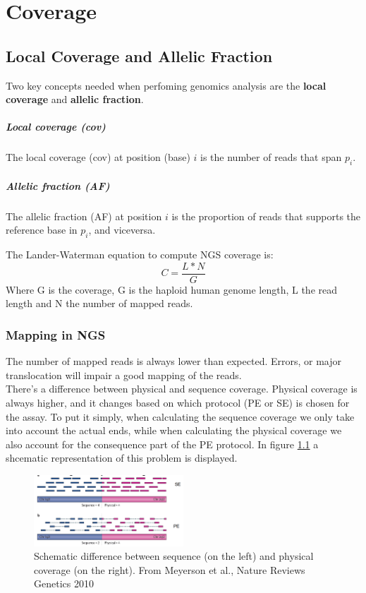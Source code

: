 \graphicspath{{chapters/02/}}
\chapter{Coverage}
\section{Local Coverage and Allelic Fraction}
Two key concepts needed when perfoming genomics analysis are the \textbf{local coverage} and \textbf{allelic fraction}.

	\paragraph*{Local coverage (cov)}
		The local coverage (cov) at position (base) $i$ is the number of reads that span $p_i$.
	\paragraph*{Allelic fraction (AF)}
		The allelic fraction (AF) at position $i$ is the proportion of reads that supports 			the reference base in $p_i$, and viceversa. 

The Lander-Waterman equation to compute NGS coverage is:
\begin{equation}
C = \frac{L * N}{G}
\end{equation}
Where G is the coverage, G is the haploid human genome length, L the read length and N the number of mapped reads.

\subsection{Mapping in NGS}
The number of mapped reads is always lower than expected. Errors, or major translocation will impair a good mapping of the reads. \\
There's a difference between physical and sequence coverage. Physical coverage is always higher, and it changes based on which protocol (PE or SE) is chosen for the assay.
To put it simply, when calculating the sequence coverage we only take into account the actual ends, while when calculating the physical coverage we also account for the consequence part of the PE protocol. In figure \ref{fig:seq_phys} a  shcematic representation of this problem is displayed.
\begin{figure}[htbp!]
    \centering
    \includegraphics[width=0.5\textwidth]{seq_phys.png}
    \caption{Schematic difference between sequence (on the left) and physical coverage (on the right). From Meyerson et al., Nature Reviews Genetics 2010}
    \label{fig:seq_phys}
\end{figure}


